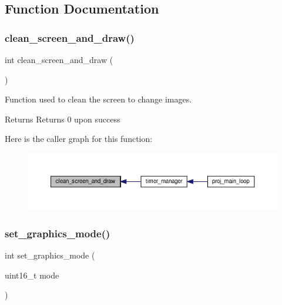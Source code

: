 \subsection{Function Documentation}
\mbox{\label{group__video__card_ga0b82755b321546975e5137f974c4ce3d}} 
\subsubsection{\texorpdfstring{clean\+\_\+screen\+\_\+and\+\_\+draw()}{clean\_screen\_and\_draw()}}
{\footnotesize\ttfamily int clean\+\_\+screen\+\_\+and\+\_\+draw (\begin{DoxyParamCaption}{ }\end{DoxyParamCaption})}



Function used to clean the screen to change images. 

\begin{DoxyReturn}{Returns}
Returns 0 upon success 
\end{DoxyReturn}
Here is the caller graph for this function\+:
\nopagebreak
\begin{figure}[H]
\begin{center}
\leavevmode
\includegraphics[width=350pt]{group__video__card_ga0b82755b321546975e5137f974c4ce3d_icgraph}
\end{center}
\end{figure}
\mbox{\label{group__video__card_ga430711ee8dd8b9944c9393b6f333f48d}} 
\subsubsection{\texorpdfstring{set\+\_\+graphics\+\_\+mode()}{set\_graphics\_mode()}}
{\footnotesize\ttfamily int set\+\_\+graphics\+\_\+mode (\begin{DoxyParamCaption}\item[{uint16\+\_\+t}]{mode }\end{DoxyParamCaption})}



